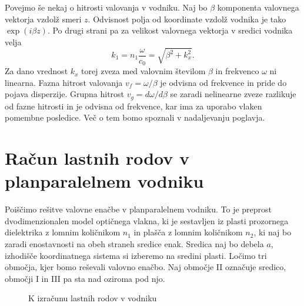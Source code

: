 Povejmo še nekaj o hitrosti valovanja v vodniku.
Naj bo $\beta$ komponenta valovnega vektorja vzdolž smeri $z$. Odvisnost polja
od koordinate vzdolž vodnika je tako $\exp (i\beta z)$. Po drugi strani pa za velikost
valovnega vektorja v sredici vodnika velja
\begin{equation}
k_1 = n_{1}\frac{\omega}{c_0}=\sqrt{\beta^{2}+k_{x}^{2}}
\label{9.0}.
\end{equation}
Za dano vrednost $k_{x}$ torej zveza med valovnim številom $\beta$
in frekvenco $\omega$ ni linearna. Fazna hitrost 
valovanja $v_{f}=\omega/\beta$ je
odvisna od frekvence in pride do pojava disperzije. Grupna 
hitrost $v_{g}=d\omega/d\beta$ 
se zaradi nelinearne zveze razlikuje od fazne hitrosti in je odvisna od 
frekvence, kar ima za uporabo vlaken pomembne posledice. Več o tem bomo spoznali 
v nadaljevanju poglavja. 

\section{Račun lastnih rodov v planparalelnem vodniku}
Poiščimo rešitve valovne enačbe v planparalelnem vodniku. 
To je preprost dvodimenzionalen model optičnega vlakna, ki je sestavljen iz 
plasti prozornega dielektrika z lomnim količnikom $n_1$ in plašča z lomnim količnikom $n_2$, 
ki naj bo zaradi enostavnosti na obeh straneh sredice enak. 
Sredica naj bo debela $a$, izhodišče koordinatnega sistema
si izberemo na sredini plasti. Ločimo tri območja, kjer bomo reševali valovno enačbo.
Naj območje II označuje sredico, območji I in III pa sta nad oziroma pod njo. 

\begin{figure}[h]
\centering
\def\svgwidth{120truemm} 

\caption{K izračunu lastnih rodov v vodniku}
\label{fig:vodnikracun}
\end{figure}

